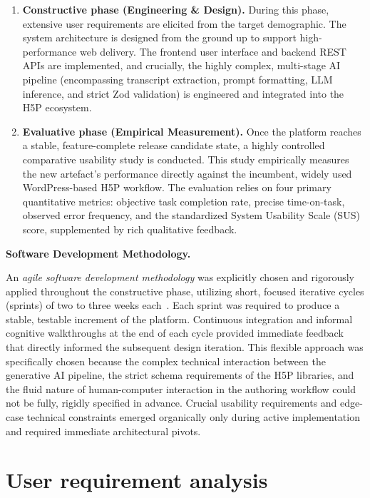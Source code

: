 \begin{enumerate}
  \item \textbf{Constructive phase (Engineering \& Design).} During this phase, extensive user requirements are elicited from the target demographic. The system architecture is designed from the ground up to support high-performance web delivery. The frontend user interface and backend REST APIs are implemented, and crucially, the highly complex, multi-stage AI pipeline (encompassing transcript extraction, prompt formatting, LLM inference, and strict Zod validation) is engineered and integrated into the H5P ecosystem.
  
  \item \textbf{Evaluative phase (Empirical Measurement).} Once the platform reaches a stable, feature-complete release candidate state, a highly controlled comparative usability study is conducted. This study empirically measures the new artefact's performance directly against the incumbent, widely used WordPress-based H5P workflow. The evaluation relies on four primary quantitative metrics: objective task completion rate, precise time-on-task, observed error frequency, and the standardized System Usability Scale (SUS) score, supplemented by rich qualitative feedback.
\end{enumerate}

\textbf{Software Development Methodology.}

An \emph{agile software development methodology} was explicitly chosen and rigorously applied throughout the constructive phase, utilizing short, focused iterative cycles (sprints) of two to three weeks each~\cite{beck2001}. Each sprint was required to produce a stable, testable increment of the platform. Continuous integration and informal cognitive walkthroughs at the end of each cycle provided immediate feedback that directly informed the subsequent design iteration. This flexible approach was specifically chosen because the complex technical interaction between the generative AI pipeline, the strict schema requirements of the H5P libraries, and the fluid nature of human-computer interaction in the authoring workflow could not be fully, rigidly specified in advance. Crucial usability requirements and edge-case technical constraints emerged organically only during active implementation and required immediate architectural pivots.

\section{User requirement analysis}
\label{sec:requirements}

